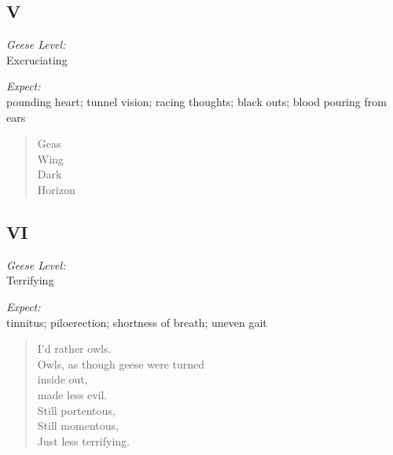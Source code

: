 \newpage

\subsection*{V}
\noindent\begin{paracol}{2}
    \begin{flushright}
      \textit{Geese Level:}\\
      Excruciating

      \textit{Expect:}\\
      pounding heart; tunnel vision; racing thoughts; black outs; blood pouring from ears
    \end{flushright}
    \switchcolumn
    \begin{verse}
      Geas\\
      \vin Wing \\
      \vin \vin Dark \\
      \vin \vin \vin Horizon
    \end{verse}
\end{paracol}

\newpage

\subsection*{VI}
\noindent\begin{paracol}{2}
    \begin{flushright}
      \textit{Geese Level:}\\
      Terrifying

      \textit{Expect:}\\
      tinnitus; piloerection; shortness of breath; uneven gait
    \end{flushright}
    \switchcolumn
    \begin{verse}
      I'd rather owls.\\
      Owls, as though geese were turned \\
      \vin inside out,\\
      \vin \vin made less evil.\\
      Still portentous,\\
      \vin Still momentous,\\
      \vin \vin Just less terrifying.
    \end{verse}
\end{paracol}

\newpage

